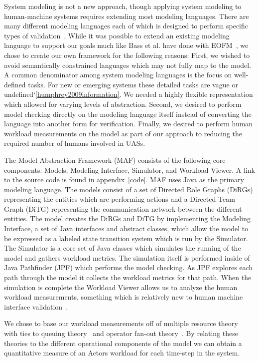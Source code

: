 System modeling is not a new approach, though applying system modeling to human-machine systems requires extending most modeling languages.  There are many different modeling languages each of which is designed to perform specific types of validation~\cite{bolton2013litreview}.  While it was possible to extend an existing modeling language to support our goals much like Bass et al. have done with EOFM~\cite{bass2011toward}, we chose to create our own framework for the following reasons:  
First, we wished to avoid semantically constrained languages which may not fully map to the model.  A common denominator among system modeling languages is the focus on well-defined tasks.  For new or emerging systems these detailed tasks are vague or undefined`\ref{humphrey2009information}.  We needed a highly flexible representation which allowed for varying levels of abstraction.  
Second, we desired to perform model checking directly on the modeling language itself instead of converting the language into another form for verification.
Finally, we desired to perform human workload measurements on the model as part of our approach to reducing the required number of humans involved in UASs.

The Model Abstraction Framework (MAF) consists of the following core components:  Models, Modeling Interface, Simulator, and Workload Viewer.  A link to the source code is found in appendix~\ref{code}.  MAF uses Java as the primary modeling language.  The models consist of a set of Directed Role Graphs (DiRGs) representing the entities which are performing actions and a Directed Team Graph (DiTG) representing the communication network between the different entities.  The model creates the DiRGs and DiTG by implementing the Modeling Interface, a set of Java interfaces and abstract classes, which allow the model to be expressed as a labeled state transition system which is run by the Simulator.  The Simulator is a core set of Java classes which simulates the running of the model and gathers workload metrics.  The simulation itself is performed inside of Java Pathfinder (JPF) which performs the model checking.  As JPF explores each path through the model it collects the workload metrics for that path.  When the simulation is complete the Workload Viewer allows us to analyze the human workload measurements, something which is relatively new to human machine interface validation~\cite{bolton2013litreview}.

We chose to base our workload measurements off of multiple resource theory~\cite{wickens2002multiple} with ties to queuing theory~\cite{newell1994unified} and operator fan-out theory~\cite{goodrich2010fanout}.  By relating these theories to the different operational components of the model we can obtain a quantitative measure of an Actors workload for each time-step in the system.


